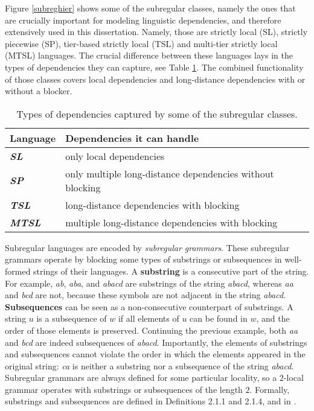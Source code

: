 Figure \ref{subreghier} shows some of the subregular classes, namely the ones that are crucially important for modeling linguistic dependencies, and therefore extensively used in this dissertation.
Namely, those are strictly local (SL), strictly piecewise (SP), tier-based strictly local (TSL) and multi-tier strictly local (MTSL) languages.
The crucial difference between these languages lays in the types of dependencies they can capture, see Table \ref{subregclasses}.
The combined functionality of those classes covers local dependencies and long-distance dependencies with or without a blocker.


\begin{table}[h!]
\begin{center}
\begin{tabular}{|l|l|}
\hline
\textbf{Language}      & \textbf{Dependencies it can handle}                       \\ \hline
\textit{\textbf{SL}}   & only local dependencies                                   \\ \hline
\textit{\textbf{SP}}   & only multiple long-distance dependencies without blocking \\ \hline
\textit{\textbf{TSL}}  & long-distance dependencies with blocking                  \\ \hline
\textit{\textbf{MTSL}} & multiple long-distance dependencies with blocking         \\ \hline
\end{tabular}
\caption{Types of dependencies captured by some of the subregular classes.}
\label{subregclasses}
\end{center}
\end{table}



Subregular languages are encoded by \emph{subregular grammars}.
These subregular grammars operate by blocking some types of substrings or subsequences in well-formed strings of their languages.
A \textbf{substring} is a consecutive part of the string.
For example, \emph{ab}, \emph{aba}, and \emph{abacd} are substrings of the string \emph{abacd}, whereas \emph{aa} and \emph{bcd} are not, because these symbols are not adjacent in the string \emph{abacd}.
\textbf{Subsequences} can be seen as a non-consecutive counterpart of substrings.
A string $u$ is a subsequence of $w$ if all elements of $u$ can be found in $w$, and the order of those elements is preserved.
Continuing the previous example, both \emph{aa} and \emph{bcd} are indeed subsequences of \emph{abacd}.
Importantly, the elements of substrings and subsequences cannot violate the order in which the elements appeared in the original string: \emph{ca} is neither a substring nor a subsequence of the string \emph{abacd}.
Subregular grammars are always defined for some particular locality, so a $2$-local grammar operates with substrings or subsequences of the length $2$.
Formally, substrings and subsequences are defined in Definitions 2.1.1 and 2.1.4, and in \citep[a.o.]{ElzingaEtAl2008,Rogers-HeinzEtAl-2010-LPTSS,Fu2011}.


